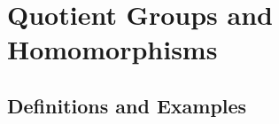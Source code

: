 \documentclass[9pt]{book}
\newcommand{\Z}{\mathbb{Z}}
\begin{document}
         
   \chapter{Quotient Groups and Homomorphisms}
      \section{Definitions and Examples}
         
\begin{comment}
   \chapter{Preliminaries}
      \section{Basics}
         
      \section{Properties Of The Integers}
         
      \section{$\Z/n\Z$ : The Integers Modulo $n$}
         
         
   \part{}

   \chapter{Introduction To Groups}
      \section{Basic Axioms And Examples}
         
      \section{Dihedral Groups}
         
      \section{Symmetric Groups}
         

\end{comment}
\end{document}
